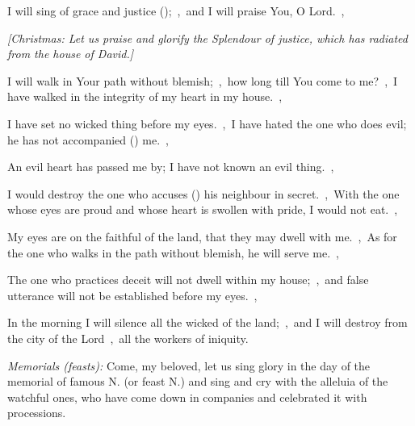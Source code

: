 \documentclass[12pt,twoside,a5paper]{article}
\begin{document}

\begin{normalparskip}
  I will sing of grace and justice ();~\sep\ and I will praise You, O Lord.~\sep


  \emph{[Christmas: Let us praise and glorify the Splendour of justice, which has radiated from the house of David.]}

  I will walk in Your path without blemish;~\sep\ how long till You come to me?~\sep\ I have walked in the integrity of my heart in my house.~\sep

  I have set no wicked thing before my eyes.~\sep\ I have hated the one who does evil; he has not accompanied () me.~\sep

  An evil heart has passed me by; I have not known an evil thing.~\sep

  I would destroy the one who accuses () his neighbour in secret.~\sep\ With the one whose eyes are proud and whose heart is swollen with pride, I would not eat.~\sep

  My eyes are on the faithful of the land, that they may dwell with me.~\sep\ As for the one who walks in the path without blemish, he will serve me.~\sep

  The one who practices deceit will not dwell within my house;~\sep\ and false utterance will not be established before my eyes.~\sep

  In the morning I will silence all the wicked of the land;~\sep\ and I will destroy from the city of the Lord~\sep\ all the workers of iniquity.

  \emph{Memorials (feasts):} Come, my beloved, let us sing glory in the day of the memorial of famous N. (or feast N.) and sing and cry with the alleluia of the watchful ones, who have come down in companies and celebrated it with processions.
\end{normalparskip}



\end{document}
